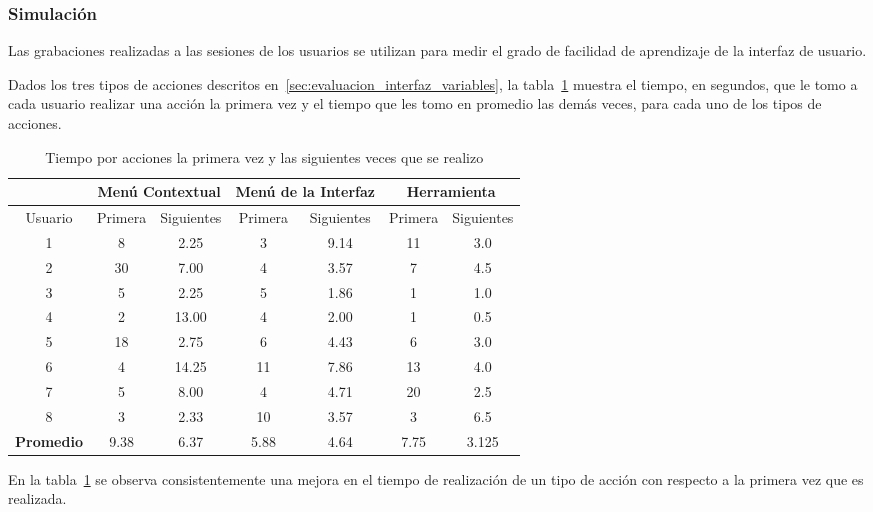 \subsubsection{Simulación}

Las grabaciones realizadas a las sesiones de los usuarios se utilizan para medir
el grado de facilidad de aprendizaje de la interfaz de usuario.

Dados los tres tipos de acciones descritos en~\ref{sec:evaluacion_interfaz_variables}, la
tabla~\ref{tab:interfaz_tiempo_acciones} muestra el tiempo, en segundos,
que le tomo a cada usuario realizar una acción la primera vez y 
el tiempo que les tomo en promedio las demás veces, para cada uno de los tipos 
de acciones.


\begin{table}[!hbt]
\centering
\begin{tabular}{|c|c|c|c|c|c|c|}
\hline
\rowcolor{gris} \textbf{} & \multicolumn{2}{|c|}{\textbf{Menú Contextual}} &
\multicolumn{2}{|c|}{\textbf{Menú de la Interfaz}} &
\multicolumn{2}{|c|}{\textbf{Herramienta}}\\
\hline
\rowcolor{gris} Usuario & Primera & Siguientes & Primera & Siguientes & Primera & Siguientes \\
\hline 1 &  8 &  2.25 &  3 & 9.14 & 11 & 3.0 \\
\hline 2 & 30 &  7.00 &  4 & 3.57 &  7 & 4.5 \\
\hline 3 &  5 &  2.25 &  5 & 1.86 &  1 & 1.0 \\
\hline 4 &  2 & 13.00 &  4 & 2.00 &  1 & 0.5 \\
\hline 5 & 18 &  2.75 &  6 & 4.43 &  6 & 3.0 \\
\hline 6 &  4 & 14.25 & 11 & 7.86 & 13 & 4.0 \\
\hline 7 &  5 &  8.00 &  4 & 4.71 & 20 & 2.5 \\
\hline 8 &  3 &  2.33 & 10 & 3.57 &  3 & 6.5 \\
\hline
\textbf{Promedio} & 9.38 & 6.37 & 5.88 & 4.64 & 7.75 & 3.125 \\
\end{tabular}
\caption{Tiempo por acciones la primera vez y las siguientes veces que se realizo}
\label{tab:interfaz_tiempo_acciones}
\end{table}

En la tabla~\ref{tab:interfaz_tiempo_acciones} se observa consistentemente una 
mejora en el tiempo de realización de un tipo de acción con respecto a la primera vez 
que es realizada. 

